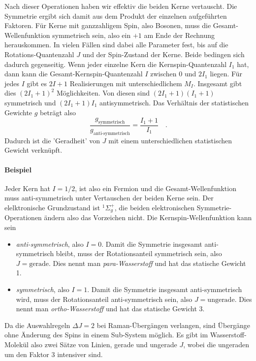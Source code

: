\begin{marginfigure}[-50mm]
\caption{Eine Folge von Symmetrie-Operationen bewirken das Tauschen der Kerne, nach \cite{HertelSchulz-2}. Die Ellipse symbolisiert die Elektronen-Wellenfunktion, deren Orientierung durch den dickeren Teil angezeigt wird.}
\end{marginfigure}

 
 
Nach dieser Operationen haben wir effektiv die beiden Kerne vertauscht. Die Symmetrie ergibt sich damit aus dem Produkt der einzelnen aufgeführten Faktoren. Für Kerne mit ganzzahligem Spin, also Bosonen, muss die Gesamt-Wellenfunktion symmetrisch sein, also ein $+1$ am Ende der Rechnung herauskommen. In vielen Fällen sind dabei alle Parameter fest, bis auf die Rotations-Quantenzahl $J$ und der Spin-Zustand der Kerne. Beide bedingen sich dadurch gegenseitig. Wenn jeder einzelne Kern die Kernspin-Quantenzahl $I_1$ hat, dann kann die Gesamt-Kernspin-Quantenzahl $I$ zwischen $0$ und $2 I_1$ liegen. Für jedes $I$ gibt es $2 I +1$ Realisierungen mit unterschiedlichem $M_I$. Insgesamt gibt dies $(2 I_1 + 1)^2$ Möglichkeiten. Von diesen sind $(2 I_1 +1)( I_1 +1)$ symmetrisch und $(2 I_1 +1) I_1$ antisymmetrisch. Das Verhältnis der statistischen Gewichte $g$ beträgt also
\begin{equation}
 \frac{g_\text{symmetrisch}}{g_\text{anti-symmetrisch}} = \frac{I_1 + 1}{I_1} \quad .
\end{equation}
Dadurch ist die  'Geradheit' von $J$ mit einem unterschiedlichen statistischen Gewicht verknüpft.




\paragraph{Beispiel } Jeder Kern hat $I = 1/2$, ist also ein Fermion und die Gesamt-Wellenfunktion muss anti-symmetrisch unter Vertauschen der beiden Kerne sein. 
Der elelktronische Grundzustand ist $^1\Sigma_g^+$, die beiden elektronischen Symmetrie-Operationen ändern also das Vorzeichen nicht.
Die Kernspin-Wellenfunktion kann sein
\begin{itemize}
\item \emph{anti-symmetrisch}, also $I = 0$. Damit die Symmetrie insgesamt anti-symmetrisch bleibt, muss der Rotationsanteil symmetrisch sein, also $J = \text{gerade}$. Dies nennt man \emph{para-Wasserstoff} und hat das statische Gewicht 1.

\item \emph{symmetrisch}, also $I = 1$. Damit die Symmetrie insgesamt anti-symmetrisch wird, muss der Rotationsanteil anti-symmetrisch sein, also $J = \text{ungerade}$. Dies nennt man \emph{ortho-Wasserstoff} und hat das statische Gewicht 3.
\end{itemize}
%
Da die Auswahlregeln $\Delta J = 2$ bei Raman-Übergängen verlangen, sind Übergänge ohne Änderung des Spins in einem Sub-System möglich. Es gibt im Wasserstoff-Molekül  also zwei Sätze von Linien, gerade und ungerade $J$, wobei die ungeraden um den Faktor 3 intensiver sind.




